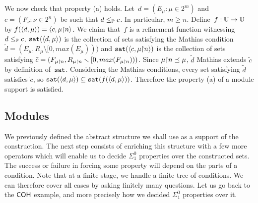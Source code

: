 We now check that property (a) holds.
Let~$d = (E_\mu : \mu \in 2^m)$ and $c = (F_\nu : \nu \in 2^n)$ be such that $d \leq_{\mathbb{P}} c$. In particular, $m \geq n$.
Define~$f : \mathbb{U} \to \mathbb{U}$ by $f(\left\langle d, \mu \right\rangle) = \left\langle c, \mu {\upharpoonright} n \right\rangle$. 
We claim that~$f$ is a refinement function witnessing~$d \leq_{\mathbb{P}} c$.
$\mathtt{sat}(\left\langle d,\mu \right\rangle)$ is the collection of sets satisfying the Mathias condition 
$\tilde{d} = (E_\mu, R_\mu \setminus [0, max(E_\mu)))$
and $\mathtt{sat}(\left\langle c, \mu {\upharpoonright} n \right\rangle)$ is the collection of sets 
satisfying $\tilde{c} = (F_{\mu {\upharpoonright} n}, R_{\mu {\upharpoonright} n} \smallsetminus [0, max(F_{\mu {\upharpoonright} n})))$.
Since $\mu {\upharpoonright} n \preceq \mu$, $\tilde{d}$ Mathias extends $\tilde{c}$ by definition of~$\mathtt{sat}$.
Considering the Mathias conditions, every set satisfying $\tilde{d}$ satisfies $\tilde{c}$,
so $\mathtt{sat}(\left\langle d,\mu \right\rangle) \subseteq \mathtt{sat}(f(\left\langle d,\mu \right\rangle))$. Therefore the property (a) of a module support is satisfied.

\subsection{Modules}

We previously defined the abstract structure we shall use as a support of the construction.
The next step consists of enriching this structure with a few more operators which will enable us to decide $\Sigma^0_1$ properties
over the constructed sets. The success or failure in forcing some property will depend on the parts of a condition. Note that at a finite stage, we handle a finite tree of conditions. We can therefore cover all cases by asking finitely many questions.
Let us go back to the $\operatorname{\sf{COH}}$ example, and more precisely how we decided $\Sigma^0_1$ properties over it.

